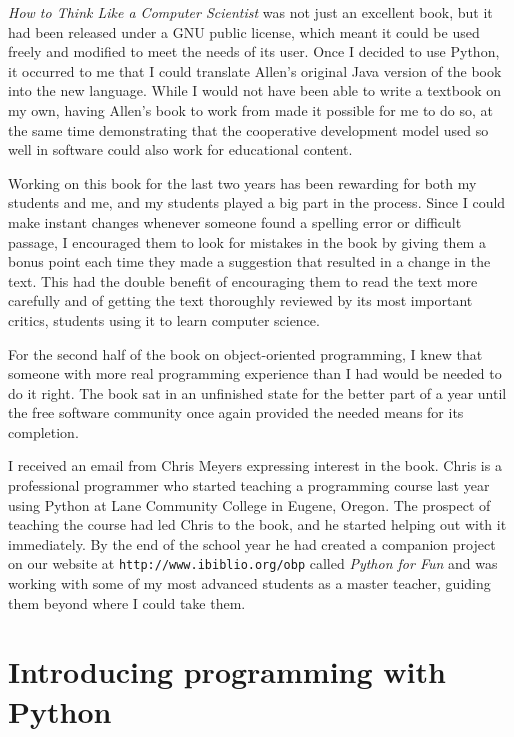 {\em How to Think Like a Computer Scientist} was not just an excellent
book, but it had been released under a GNU public license, which meant
it could be used freely and modified to meet the needs of its user.
Once I decided to use Python, it occurred to me that I could translate
Allen's original Java version of the book into the new language.
While I would not have been able to write a textbook on my own, having
Allen's book to work from made it possible for me to do so, at the
same time demonstrating that the cooperative development model used so
well in software could also work for educational content.

Working on this book for the last two years has been rewarding for
both my students and me, and my students played a big part in the
process. Since I could make instant changes whenever someone found a
spelling error or difficult passage, I encouraged them to look for
mistakes in the book by giving them a bonus point each time they made
a suggestion that resulted in a change in the text. This had the
double benefit of encouraging them to read the text more carefully and
of getting the text thoroughly reviewed by its most important critics,
students using it to learn computer science.


For the second half of the book on object-oriented programming, I knew
that someone with more real programming experience than I had would be
needed to do it right.  The book sat in an unfinished state for the better
part of a year until the free software community once again provided the
needed means for its completion.

I received an email from Chris Meyers expressing interest in the book.
Chris is a professional programmer who started teaching a programming
course last year using Python at Lane Community College in Eugene,
Oregon.  The prospect of teaching the course had led Chris to the
book, and he started helping out with it immediately.  By the end of
the school year he had created a companion project on our website at
{\tt http://www.ibiblio.org/obp} called {\em Python for Fun} and was
working with some of my most advanced students as a master teacher,
guiding them beyond where I could take them.


\section*{Introducing programming with Python}

